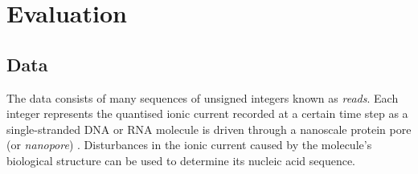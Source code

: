 \chapter{Evaluation} \label{chap:evaluation}

\section{Data} \label{sec:data}

The data consists of many sequences of unsigned integers known as \textit{reads}. Each integer represents the quantised ionic current recorded at a certain time step as a single-stranded DNA or RNA molecule is driven through a nanoscale protein pore (or \textit{nanopore}) \cite{Wang2021}. Disturbances in the ionic current caused by the molecule's biological structure can be used to determine its nucleic acid sequence.

